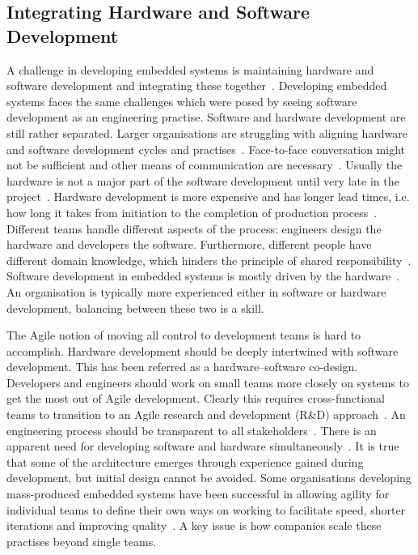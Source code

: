 \documentclass[english]{tktltiki2}
\begin{document}
\subsection{Integrating Hardware and Software Development}

A challenge in developing embedded systems is maintaining hardware and software development and integrating these together~\cite{EB12, EHS14}. Developing embedded systems faces the same challenges which were posed by seeing software development as an engineering practise. Software and hardware development are still rather separated. Larger organisations are struggling with aligning hardware and software development cycles and practises~\cite{EHS14}. Face-to-face conversation might not be sufficient and other means of communication are necessary~\cite{RA03}. Usually the hardware is not a major part of the software development until very late in the project~\cite{RA03}. Hardware development is more expensive and has longer lead times, i.e. how long it takes from initiation to the completion of production process~\cite{EHS14}. Different teams handle different aspects of the process: engineers design the hardware and developers the software. Furthermore, different people have different domain knowledge, which hinders the principle of shared responsibility~\cite{KRM13, EHS14}. Software development in embedded systems is mostly driven by the hardware~\cite{BE12}. An organisation is typically more experienced either in software or hardware development, balancing between these two is a skill.

The Agile notion of moving all control to development teams is hard to accomplish. Hardware development should be deeply intertwined with software development. This has been referred as a hardware–software co-design. Developers and engineers should work on small teams more closely on systems to get the most out of Agile development. Clearly this requires cross-functional teams to transition to an Agile research and development (R\&D) approach~\cite{HAB12, EHS14}. An engineering process should be transparent to all stakeholders~\cite{KRM13}. There is an apparent need for developing software and hardware simultaneously~\cite{RA03}. It is true that some of the architecture emerges through experience gained during development, but initial design cannot be avoided. Some organisations developing mass-produced embedded systems have been successful in allowing agility for individual teams to define their own ways on working to facilitate speed, shorter iterations and improving quality~\cite{EHS14}. A key issue is how companies scale these practises beyond single teams.
\end{document}
